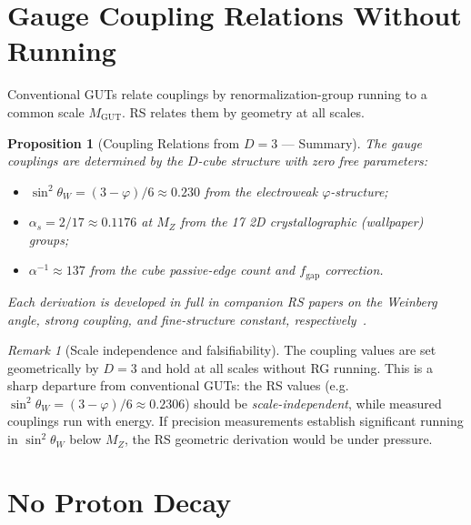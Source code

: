 \documentclass[12pt,a4paper]{article}
\newtheorem{proposition}[theorem]{Proposition}
\theoremstyle{definition}
\theoremstyle{remark}
\newtheorem{remark}[theorem]{Remark}
\begin{document}
\section{Gauge Coupling Relations Without Running}
\label{sec:couplings}

Conventional GUTs relate couplings by renormalization-group running
to a common scale $M_{\mathrm{GUT}}$.  RS relates them by geometry
at all scales.

\begin{proposition}[Coupling Relations from $D = 3$ --- Summary]
\label{thm:couplings}
The gauge couplings are determined by the $D$-cube structure with zero
free parameters:
\begin{itemize}[noitemsep]
\item $\sin^2\theta_W = (3 - \varphi)/6 \approx 0.230$ from the
  electroweak $\varphi$-structure;
\item $\alpha_s = 2/17 \approx 0.1176$ at $M_Z$ from the 17
  2D crystallographic (wallpaper) groups;
\item $\alpha^{-1} \approx 137$ from the cube passive-edge count
  and $f_{\mathrm{gap}}$ correction.
\end{itemize}
Each derivation is developed in full in companion RS papers on
the Weinberg angle, strong coupling, and fine-structure constant,
respectively~\cite{RS_Axioms}.
\end{proposition}

\begin{remark}[Scale independence and falsifiability]
The coupling values are set geometrically by $D = 3$ and hold at all
scales without RG running.  This is a sharp departure from conventional
GUTs: the RS values (e.g.\ $\sin^2\theta_W = (3-\varphi)/6 \approx
0.2306$) should be \emph{scale-independent}, while measured couplings
run with energy.  If precision measurements establish significant
running in $\sin^2\theta_W$ below $M_Z$, the RS geometric derivation
would be under pressure.
\end{remark}

\section{No Proton Decay}
\label{sec:proton-decay}
\end{document}
